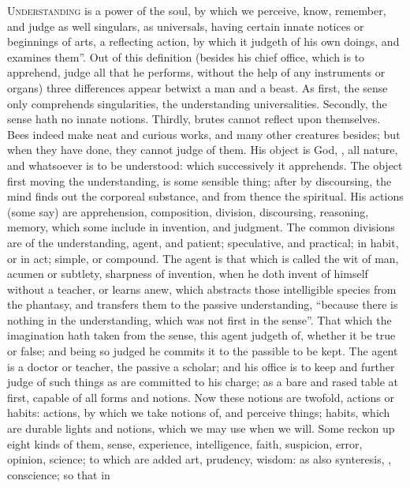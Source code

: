 \lettrine[ante={\large{}``}]{U}{nderstanding} is a power of the soul,
by which we perceive, know, remember, and judge as well
singulars, as universals, having certain innate notices or beginnings of arts,
a reflecting action, by which it judgeth of his own doings, and examines them''.
Out of this definition (besides his chief office, which is to apprehend, judge
all that he performs, without the help of any instruments or organs) three
differences appear betwixt a man and a beast. As first, the sense only
comprehends singularities, the understanding universalities. Secondly, the
sense hath no innate notions. Thirdly, brutes cannot reflect upon themselves.
Bees indeed make neat and curious works, and many other creatures besides; but
when they have done, they cannot judge of them. His object is God,
, all nature, and whatsoever is to be understood: which
successively it apprehends. The object first moving the understanding, is some
sensible thing; after by discoursing, the mind finds out the corporeal
substance, and from thence the spiritual. His actions (some say) are
apprehension, composition, division, discoursing, reasoning, memory, which some
include in invention, and judgment. The common divisions are of the
understanding, agent, and patient; speculative, and practical; in habit, or in
act; simple, or compound. The agent is that which is called the wit of man,
acumen or subtlety, sharpness of invention, when he doth invent of himself
without a teacher, or learns anew, which abstracts those intelligible species
from the phantasy, and transfers them to the passive understanding,
\enquote{because there is nothing in the understanding, which was
not first in the sense}. That which the imagination hath taken from the sense,
this agent judgeth of, whether it be true or false; and being so judged he
commits it to the passible to be kept. The agent is a doctor or teacher, the
passive a scholar; and his office is to keep and further judge of such things
as are committed to his charge; as a bare and rased table at first, capable of
all forms and notions. Now these notions are twofold, actions or habits:
actions, by which we take notions of, and perceive things; habits, which are
durable lights and notions, which we may use when we will. Some reckon up eight
kinds of them, sense, experience, intelligence, faith, suspicion, error,
opinion, science; to which are added art, prudency, wisdom: as also
synteresis, , conscience; so that in
